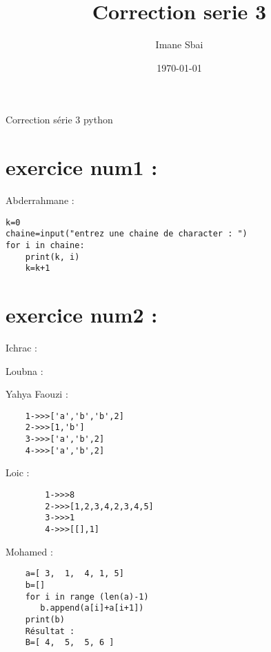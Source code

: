 \documentclass{article}
\title{Correction serie 3}
\author{Imane Sbai}
\date {\today}
\begin{document}
\begin{titlepage}
    \begin{center}
Correction s\'{e}rie 3 python
    \end{center}
\end{titlepage}

\section{exercice num1 :}
	\begin{center}
    		Abderrahmane :
	\end{center} 
	
\begin{lstlisting}
k=0
chaine=input("entrez une chaine de character : ")
for i in chaine:
	print(k, i)
	k=k+1
\end{lstlisting}
\section{exercice num2 :}

	\begin{center}
    		Ichrac :
	\end{center}
	
	
	\begin{center}
    		Loubna :
	\end{center} 
	

        \begin{center}
    		 Yahya Faouzi :
	\end{center}    	  
        	
    \begin{lstlisting}
    1->>>['a','b','b',2]
    2->>>[1,'b']
    3->>>['a','b',2]
    4->>>['a','b',2]
    \end{lstlisting}
         
	\begin{center}
    		Loic :
	\end{center} 
	
	\begin{lstlisting}
		1->>>8
		2->>>[1,2,3,4,2,3,4,5]
		3->>>1
		4->>>[[],1]
	\end{lstlisting}
	
	\begin{center}
    		Mohamed :
	\end{center}
	
	\begin{lstlisting}
    a=[ 3,  1,  4, 1, 5]
    b=[]
    for i in range (len(a)-1)
       b.append(a[i]+a[i+1])
    print(b)
    Résultat :
    B=[ 4,  5,  5, 6 ]
	\end{lstlisting}
\end{document}

